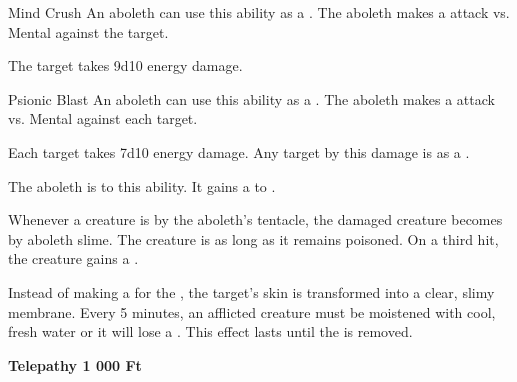     \begin{freeability}{Mind Crush}
      An aboleth can use this ability as a . The aboleth makes a  attack
        vs. Mental against the target.
    
    \hit The target takes 9d10 energy damage.
    \end{freeability}
  

    \begin{freeability}{Psionic Blast}
      An aboleth can use this ability as a . The aboleth makes a  attack
        vs. Mental against each target.
    
    \hit Each target takes 7d10 energy damage. Any target  by this damage is  as a .
    \end{freeability}
  
        The aboleth is  to this ability.
        It gains a   to .
      
        Whenever a creature is  by the aboleth's tentacle,
          the damaged creature becomes  by aboleth slime.
        The creature is  as long as it remains poisoned.
        On a third hit, the creature gains a .

        Instead of making a  for the ,
          the target's skin is transformed into a clear, slimy membrane.
        Every 5 minutes, an afflicted creature must be moistened with cool, fresh water
          or it will lose a .
        This effect lasts until the  is removed.
      
    \par \textbf{Telepathy 1 000 Ft}
  
